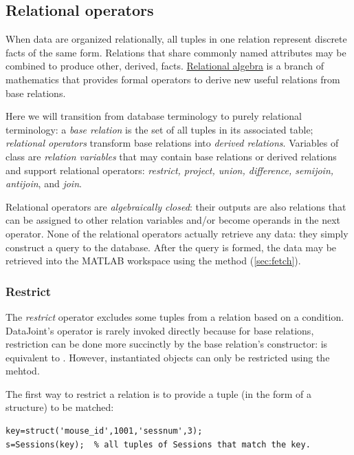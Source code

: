 \documentclass[10pt]{article}
\begin{document}
\subsection{Relational operators}\label{sec:operators}
When data are organized relationally, all tuples in one relation represent discrete facts of the same form.   Relations that share commonly named attributes may be combined to produce other, derived, facts.  \href{http://en.wikipedia.org/wiki/Relational_algebra}{Relational algebra} is a branch of mathematics that provides formal operators to derive new useful relations from base relations. 

Here we will transition from database terminology to purely relational terminology: a {\em base relation} is the set of all tuples in its associated table; {\em relational operators} transform base relations into {\em derived relations}. 
Variables of class  are {\em relation variables} that may contain base relations or derived relations and support relational operators: {\em restrict, project, union, difference, semijoin, antijoin}, and {\em join}.  

Relational operators are {\em algebraically closed}: their outputs are also relations that can be assigned to other relation variables and/or become operands in the next operator. None of the relational operators actually retrieve any data: they simply construct a query to the database.  After the query is formed, the data may be retrieved into the MATLAB workspace using the  method (\autoref{sec:fetch}).


\subsubsection{Restrict}\label{sec:restrict}
The {\em restrict} operator excludes some tuples from a relation based on a condition.  DataJoint's  operator is rarely invoked directly because for base relations, restriction can be done more succinctly by the base relation's constructor:  is equivalent to .  However, instantiated  objects can only be restricted using the  mehtod. 

The first way to restrict a relation is to provide a tuple (in the form of a structure)  to be matched:
\begin{lstlisting}
key=struct('mouse_id',1001,'sessnum',3);    
s=Sessions(key);  % all tuples of Sessions that match the key.
\end{lstlisting}
\end{document}

